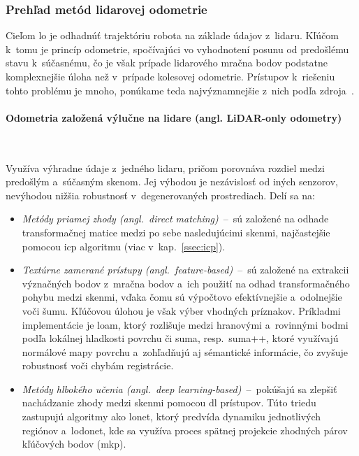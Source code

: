     \subsubsection{Prehľad metód lidarovej odometrie}

      Cieľom \acrshort{lo} je odhadnúť trajektóriu robota na základe údajov z~lidaru. Kľúčom k~tomu je princíp odometrie, spočívajúci vo vyhodnotení posunu od predošlému stavu k~súčasnému, čo je však prípade lidarového mračna bodov podstatne komplexnejšie úloha než v~prípade kolesovej odometrie. Prístupov k~riešeniu tohto problému je mnoho, ponúkame teda najvýznamnejšie z~nich podľa zdroja~\cite{leeLiDAROdometrySurvey2024}.

      \paragraph{Odometria založená výlučne na lidare (angl. LiDAR-only odometry)} \

      \noindent Využíva výhradne údaje z~jedného lidaru, pričom porovnáva rozdiel medzi predošlým a~súčasným skenom. Jej výhodou je nezávislosť od iných senzorov, nevýhodou nižšia robustnosť v~degenerovaných prostrediach. Delí sa na:
      \begin{itemize}
        \item \emph{Metódy priamej zhody (angl.\ direct matching)}~--~sú založené na odhade transformačnej matice medzi po sebe nasledujúcimi skenmi, najčastejšie pomocou \acrshort{icp} algoritmu (viac v~kap.~\ref{ssec:icp}).
        
        \item \emph{Textúrne zamerané prístupy (angl.\ feature-based)}~--~sú založené na extrakcii význačných bodov z~mračna bodov a~ich použití na odhad transformačného pohybu medzi skenmi, vďaka čomu sú výpočtovo efektívnejšie a~odolnejšie voči šumu. Kľúčovou úlohou je však výber vhodných príznakov. Príkladmi implementácie je \acrshort{loam}, ktorý rozlišuje medzi hranovými a~rovinnými bodmi podľa lokálnej hladkosti povrchu či \acrshort{suma}, resp.\ \acrshort{suma}++, ktoré využívajú normálové mapy povrchu a~zohľadňujú aj sémantické informácie, čo zvyšuje robustnosť voči chybám registrácie.
        
        \item \emph{Metódy hlbokého učenia (angl.\ deep learning-based)}~--~pokúšajú sa zlepšiť nachádzanie zhody medzi skenmi pomocou \acrshort{dl} prístupov. Túto triedu zastupujú algoritmy ako \acrshort{lonet}, ktorý predvída dynamiku jednotlivých regiónov a~\acrshort{lodonet}, kde sa využíva proces spätnej projekcie zhodných párov kľúčových bodov (\acrshort{mkp}).
      \end{itemize}

